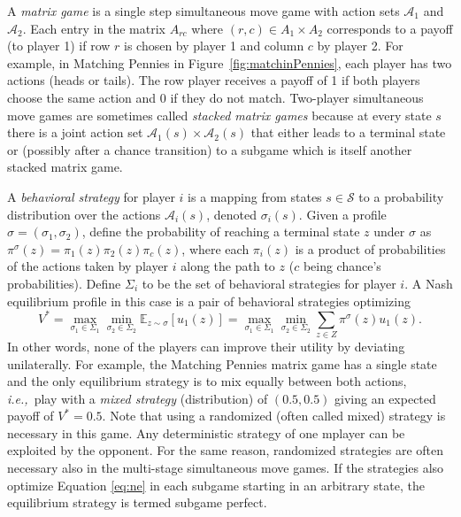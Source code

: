 \documentclass[preprint,12pt]{elsarticle}
\newcommand{\bE}{\mathbb{E}}
\newcommand{\cA}{\mathcal{A}}
\newcommand{\cS}{\mathcal{S}}
\newcommand{\ie}{{\it i.e.,}~}
\begin{document}
A {\it matrix game} is a single step simultaneous move game with action sets $\cA_1$ and $\cA_2$. 
Each entry in the matrix $A_{rc}$ where $(r,c) \in A_1 \times A_2$ corresponds to a payoff (to player 1) if row $r$ is 
chosen by player 1 and column $c$ by player 2. 
For example, in Matching Pennies in Figure~\ref{fig:matchinPennies}, each player has two actions (heads or tails). The row player receives a payoff of 1 
if both players choose the same action and 0 if they do not match. 
Two-player simultaneous move games are sometimes called {\it stacked matrix games} because at every state 
$s$ there is a joint action set $\cA_1(s) \times \cA_2(s)$ that either leads to a terminal state or (possibly after a 
chance transition) to a subgame which is itself another stacked matrix game. 

A {\it behavioral strategy} for player $i$ is a mapping from states $s \in \cS$
to a probability distribution over the actions $\cA_i(s)$, denoted $\sigma_i(s)$. 
Given a profile $\sigma = (\sigma_1, \sigma_2)$, define the probability of reaching a terminal state $z$ under $\sigma$ as 
$\pi^\sigma(z) = \pi_1(z) \pi_2(z) \pi_c(z)$, where each $\pi_i(z)$ is a product of probabilities of the actions taken 
by player $i$ along the path to $z$ ($c$ being chance's probabilities). Define $\Sigma_i$ to be the set of behavioral 
strategies for player $i$. A Nash equilibrium profile in this case is a pair of behavioral strategies optimizing
\begin{equation}\label{eq:ne}
V^* = \max_{\sigma_1 \in \Sigma_1} \min_{\sigma_2 \in \Sigma_2} \bE_{z \sim \sigma}[u_1(z)]
   = \max_{\sigma_1 \in \Sigma_1} \min_{\sigma_2 \in \Sigma_2} \sum_{z \in Z} \pi^\sigma(z) u_1(z).
\end{equation}
In other words, none of the players can improve their utility by deviating unilaterally. 
For example, the Matching Pennies matrix game has a single state and the only equilibrium strategy is to mix equally between 
both actions, \ie play with a {\it mixed strategy} (distribution) of $(0.5, 0.5)$ giving an expected payoff of $V^* = 0.5$.
Note that using a randomized (often called mixed) strategy is necessary in this game.
Any deterministic strategy of one mplayer can be exploited by the opponent. 
For the same reason, randomized strategies are often necessary also in the multi-stage simultaneous move games. 
If the strategies also optimize Equation \ref{eq:ne} in each subgame starting in an arbitrary state, the equilibrium strategy 
is termed subgame perfect.
\end{document}
